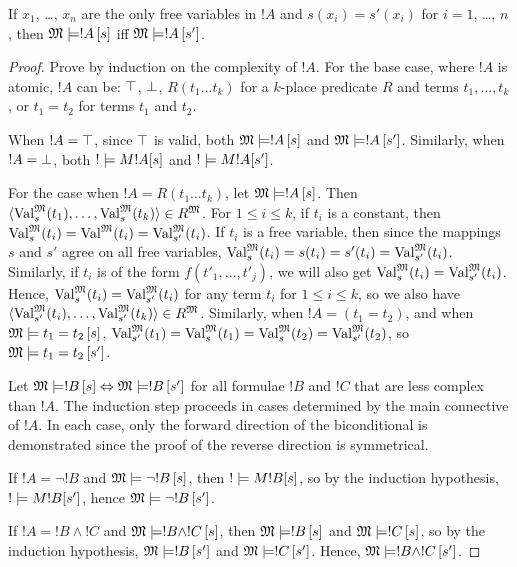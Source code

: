 \documentclass[open-logic-section]{subfiles}
\begin{document}
\begin{prop}
If $x_1$, \dots, $x_n$ are the only free variables in $!A$ and $s(x_i)
= s'(x_i)$ for $i = 1$, \dots, $n$, then $\Sat{M}{!A}[s]$ iff
$\Sat{M}{!A}[s']$.
\end{prop}

\begin{proof}

Prove by induction on the complexity of $!A$. For the base case, where $!A$ is atomic, $!A$ can be: $\top$, $\bot$, $R(t_1 \ldots t_k)$ for a $k$-place predicate $R$ and terms $t_1,\ldots,t_k$, or $t_1 = t_2$ for terms $t_1$ and $t_2$.

When $!A = \top$, since $\top$ is valid, both $\Sat{M}{!A}[s]$ and $\Sat{M}{!A}[s']$. Similarly, when $!A = \bot$, both $\Sat!{M}{!A}[s]$ and $\Sat!{M}{!A}[s']$. 

For the case when $!A = R(t_1 \ldots t_k)$, let $\Sat{M}{!A}[s]$. Then $\langle \Value{t_1}{M}[s], \ldots, \Value{t_k}{M}[s] \rangle \in \Assign{R}{M}$. For $1 \leq i \leq k$, if $t_i$ is a constant, then $\Value{t_i}{M}[s] = \Value{t_i}{M} = \Value{t_i}{M}[s']$. If $t_i$ is a free variable, then since the mappings $s$ and $s'$ agree on all free variables, $\Value{t_i}{M}[s] = s(t_i) = s'(t_i) = \Value{t_i}{M}[s']$. Similarly, if $t_i$ is of the form $f(t'_1,\ldots,t'_j)$, we will also get $\Value{t_i}{M}[s] = \Value{t_i}{M}[s']$. Hence, $\Value{t_i}{M}[s] = \Value{t_i}{M}[s']$ for any term $t_i$ for $1 \leq i \leq k$, so we also have $\langle \Value{t_i}{M}[s'], \ldots, \Value{t_k}{M}[s'] \rangle \in \Assign{R}{M}$. Similarly, when $!A = (t_1 = t_2)$, and when $\Sat{M}{t_1 = t_2}[s]$, $\Value{t_1}{M}[s'] = \Value{t_1}{M}[s] = \Value{t_2}{M}[s] = \Value{t_2}{M}[s']$, so $\Sat{M}{t_1 = t_2}[s']$.

Let $\Sat{M}{!B}[s] \Leftrightarrow \Sat{M}{!B}[s']$ for all formulae $!B$ and $!C$ that are less complex than $!A$. The induction step proceeds in cases determined by the main connective of $!A$. In each case, only the forward direction of the biconditional is demonstrated since the proof of the reverse direction is symmetrical.

If $!A = \lnot !B$ and $\Sat{M}{\lnot !B}[s]$, then $\Sat!{M}{!B}[s]$, so by the induction hypothesis, $\Sat!{M}{!B}[s']$, hence $\Sat{M}{\lnot !B}[s']$.

If $!A = !B \land !C$ and $\Sat{M}{!B \land !C}[s]$, then $\Sat{M}{!B}[s]$ and $\Sat{M}{!C}[s]$, so by the induction hypothesis, $\Sat{M}{!B}[s']$ and $\Sat{M}{!C}[s']$. Hence, $\Sat{M}{!B \land !C}[s']$.


\end{proof}
\end{document}
